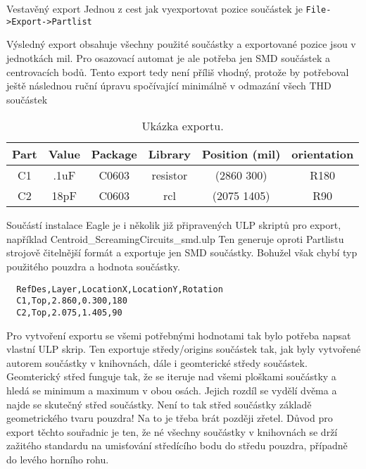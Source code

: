 Vestavěný export
Jednou z cest jak vyexportovat pozice součástek je \verb|File->Export->Partlist|


Výsledný export obsahuje všechny použité součástky a exportované pozice jsou v jednotkách mil. Pro osazovací automat je ale potřeba jen SMD součástek a centrovacích bodů. Tento export tedy není příliš vhodný, protože by potřeboval ještě následnou ruční úpravu spočívající minimálně v odmazání všech THD součástek


\begin{table}[h!]
  \caption{Ukázka exportu. }
  \begin{center}
  	\small
	  \begin{tabular}{|c|c|c|c|c|c|}
	    \hline
	    Part	& Value 	& Package 	& Library 	& Position (mil) 	& orientation	\\
	    \hline\hline

		C1 	& .1uF		& C0603		& resistor	& (2860 300)		& R180		\\
		\hline
		C2 	& 18pF		& C0603		& rcl		& (2075 1405)		& R90		\\
		\hline
	    \hline
	  \end{tabular}
  \end{center}
\end{table}

Součástí instalace Eagle je i několik již připravených ULP skriptů pro export, například Centroid\_ScreamingCircuits\_smd.ulp
Ten generuje oproti Partlistu strojově čitelnější formát a exportuje jen SMD součástky. Bohužel však chybí typ použitého pouzdra a hodnota součástky. 

\begin{verbatim}
  RefDes,Layer,LocationX,LocationY,Rotation
  C1,Top,2.860,0.300,180
  C2,Top,2.075,1.405,90
\end{verbatim}

Pro vytvoření exportu se všemi potřebnými hodnotami tak bylo potřeba napsat vlastní ULP skrip. 
Ten exportuje středy/origins součástek tak, jak byly vytvořené autorem součástky v knihovnách, dále i geomterické středy součástek. Geomterický střed funguje tak, že se iteruje nad všemi ploškami součástky a hledá se minimum a maximum v obou osách. Jejich rozdíl se vydělí dvěma a najde se skutečný střed součástky. Není to tak střed součástky základě geometrického tvaru pouzdra! Na to je třeba brát později zřetel. Důvod pro export těchto souřadnic je ten, že né všechny součástky v knihovnách se drží zažitého standardu na umisťování středícího bodu do středu pouzdra, případně do levého horního rohu.

